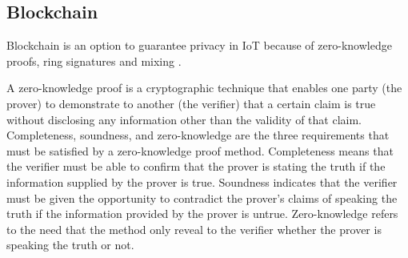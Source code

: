 


\subsection{Blockchain}

Blockchain is an option to guarantee privacy in IoT because of zero-knowledge
proofs, ring signatures and mixing \cite{PrivacyblockchainWikipedia}.

A zero-knowledge proof is a cryptographic technique that enables one party
(the prover) to demonstrate to another (the verifier) that a certain claim
is true without disclosing any information other than the validity of that
claim. Completeness, soundness, and zero-knowledge are the three requirements
that must be satisfied by a zero-knowledge proof method. Completeness means
that the verifier must be able to confirm that the prover is stating the truth
if the information supplied by the prover is true. Soundness indicates that
the verifier must be given the opportunity to contradict the prover's claims
of speaking the truth if the information provided by the prover is untrue.
Zero-knowledge refers to the need that the method only reveal to the verifier
whether the prover is speaking the truth or not.

